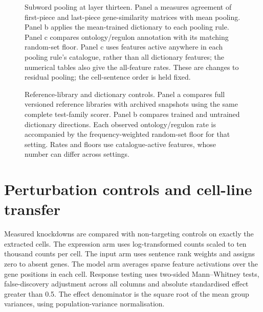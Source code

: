 \documentclass[11pt]{article}
\begin{document}
\begin{figure}[p]
\centering
\caption{Subword pooling at layer thirteen. Panel a measures agreement of first-piece and last-piece
gene-similarity matrices with mean pooling. Panel b applies the mean-trained dictionary to each
pooling rule. Panel c compares ontology/regulon annotation with its matching random-set floor.
Panel c uses features active anywhere in each pooling rule's catalogue, rather than all dictionary
features; the numerical tables also give the all-feature rates.
These are changes to residual pooling; the cell-sentence order is held fixed.}
\label{fig:pooling}
\end{figure}
\clearpage

\begin{figure}[p]
\centering
\caption{Reference-library and dictionary controls. Panel a compares full versioned reference
libraries with archived snapshots using the same complete test-family scorer. Panel b compares
trained and untrained dictionary directions. Each observed ontology/regulon rate is accompanied
by the frequency-weighted random-set floor for that setting. Rates and floors use catalogue-active
features, whose number can differ across settings.}
\label{fig:libraries}
\end{figure}
\clearpage

\section{Perturbation controls and cell-line transfer}

Measured knockdowns are compared with non-targeting controls on exactly the extracted cells.
The expression arm uses log-transformed counts scaled to ten thousand counts per cell. The input
arm uses sentence rank weights and assigns zero to absent genes. The model arm averages sparse
feature activations over the gene positions in each cell. Response testing uses two-sided
Mann--Whitney tests, false-discovery adjustment across all columns and absolute standardised
effect greater than 0.5. The effect denominator is the square root of the mean group variances,
using population-variance normalisation.
\end{document}
